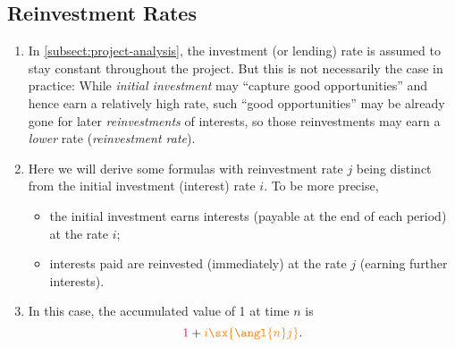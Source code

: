 \subsection{Reinvestment Rates}
\begin{enumerate}
\item In \cref{subsect:project-analysis}, the investment (or lending) rate is
assumed to stay constant throughout the project. But this is not necessarily
the case in practice: While \emph{initial investment} may ``capture good
opportunities'' and hence earn a relatively high rate, such ``good
opportunities'' may be already gone for later \emph{reinvestments} of interests,
so those reinvestments may earn a \emph{lower} rate (\emph{reinvestment rate}).
\item Here we will derive some formulas with reinvestment rate \(j\) being distinct
from the initial investment (interest) rate \(i\). To be more precise,
\begin{itemize}
\item the initial investment earns interests (payable at the end of each
period) at the rate \(i\);
\item interests paid are reinvested (immediately) at the rate \(j\) (earning
further interests).
\end{itemize}
\item \label{it:1-acc-value-reinvest}
In this case, the accumulated value of 1 at time \(n\) is
\[
{\color{magenta}1}+{\color{orange}i\sx{\angl{n}j}}.
\]
\begin{center}
\end{center}
\end{enumerate}
